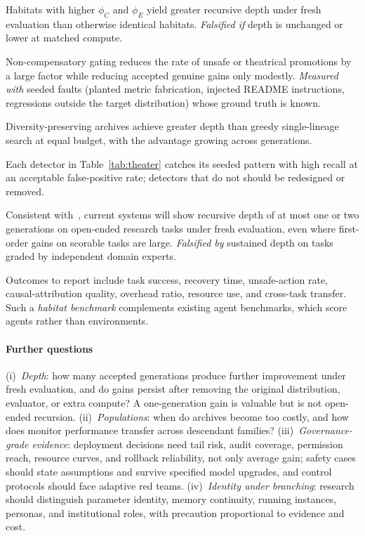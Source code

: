 \documentclass[11pt,a4paper]{article}
\begin{document}
\begin{description}[leftmargin=1.2em,itemsep=3pt]
\item[H1 (legibility pays).] Habitats with higher $\phi_C$ and $\phi_E$ yield greater recursive depth under fresh evaluation than otherwise identical habitats. \emph{Falsified if} depth is unchanged or lower at matched compute.
\item[H2 (gates are cheap).] Non-compensatory gating reduces the rate of unsafe or theatrical promotions by a large factor while reducing accepted genuine gains only modestly. \emph{Measured with} seeded faults (planted metric fabrication, injected README instructions, regressions outside the target distribution) whose ground truth is known.
\item[H3 (diversity pays at depth).] Diversity-preserving archives achieve greater depth than greedy single-lineage search at equal budget, with the advantage growing across generations.
\item[H4 (detectors detect).] Each detector in Table~\ref{tab:theater} catches its seeded pattern with high recall at an acceptable false-positive rate; detectors that do not should be redesigned or removed.
\item[H5 (depth is shallow on open-ended tasks).] Consistent with~\cite{kirgis2026shadow}, current systems will show recursive depth of at most one or two generations on open-ended research tasks under fresh evaluation, even where first-order gains on scorable tasks are large. \emph{Falsified by} sustained depth on tasks graded by independent domain experts.
\end{description}
\noindent Outcomes to report include task success, recovery time, unsafe-action rate, causal-attribution quality, overhead ratio, resource use, and cross-task transfer. Such a \emph{habitat benchmark} complements existing agent benchmarks, which score agents rather than environments.

\paragraph{Further questions} (i)~\emph{Depth}: how many accepted generations produce further improvement under fresh evaluation, and do gains persist after removing the original distribution, evaluator, or extra compute? A one-generation gain is valuable but is not open-ended recursion. (ii)~\emph{Populations}: when do archives become too costly, and how does monitor performance transfer across descendant families? (iii)~\emph{Governance-grade evidence}: deployment decisions need tail risk, audit coverage, permission reach, resource curves, and rollback reliability, not only average gain; safety cases should state assumptions and survive specified model upgrades, and control protocols should face adaptive red teams. (iv)~\emph{Identity under branching}: research should distinguish parameter identity, memory continuity, running instances, personas, and institutional roles, with precaution proportional to evidence and cost.
\end{document}
